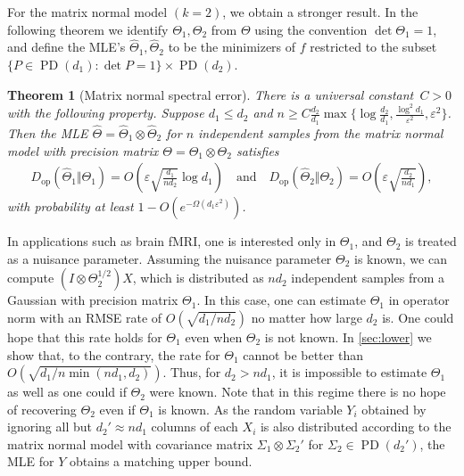 \documentclass[aos]{imsart}
\newtheorem{theorem}{Theorem}[section]
\theoremstyle{definition}
\numberwithin{equation}{section}
\DeclareMathOperator{\op}{op}
\DeclareMathOperator{\PD}{PD}
\newcommand{\htheta}{\widehat{\Theta}}
\newcommand{\ot}{\otimes}
\newcommand{\eps}{\varepsilon}
\begin{document}
For the matrix normal model $(k=2)$, we obtain a stronger result. In the following theorem we identify $\Theta_1, \Theta_2$ from $\Theta$ using the convention $\det \Theta_1 = 1$, and define the MLE's $\htheta_1, \htheta_2$ to be the minimizers of $f$ restricted to the subset $\{P \in \PD(d_1): \det P = 1\} \times \PD(d_2)$. 

\newcommand{\MatrixSpec}{%
There is a universal constant~$C>0$ with the following property.
Suppose $d_1 \leq d_2$ and $n \geq C \frac{d_2}{d_1} \max \{\log \frac{d_2}{d_1},  \frac{\log^2 d_1}{\eps^2}, \eps^2\}$. Then the MLE $\htheta = \htheta_1 \ot \htheta_2$ for $n$ independent samples from the matrix normal model with precision matrix $\Theta = \Theta_1 \ot \Theta_2$ satisfies
\begin{align*}
  D_{\op}(\widehat{\Theta}_1 \Vert \Theta_1) = O\left(\eps \sqrt{\frac{d_1}{nd_2}} \log d_1\right)
\quad\text{and}\quad
D_{\op}(\widehat{\Theta}_2 \Vert \Theta_2) = O\left(\eps \sqrt{\frac{d_2}{nd_1}}\right),
\end{align*}
with probability at least  $1 - O(e^{ - \Omega( d_1 \eps^2)})$. }


\begin{theorem}[Matrix normal spectral error]\label{thm:matrix-normal}
\MatrixSpec
\end{theorem}

In applications such as brain fMRI, one is interested only in $\Theta_1$, and $\Theta_2$ is treated as a nuisance parameter. Assuming the nuisance parameter $\Theta_2$ is known, we can compute $(I \ot \Theta_2^{1/2} )X$, which is distributed as $nd_2$ independent samples from a Gaussian with precision matrix $\Theta_1$. In this case, one can estimate $\Theta_1$ in operator norm with an RMSE rate of $O(\sqrt{ d_1/ n d_2})$ no matter how large $d_2$ is. One could hope that this rate holds for $\Theta_1$ even when $\Theta_2$ is not known. In \cref{sec:lower} we show that, to the contrary, the rate for $\Theta_1$ cannot be better than $O(\sqrt{d_1/ n \min(n d_1, d_2)})$. Thus, for $d_2 > n d_1$, it is impossible to estimate $\Theta_1$ as well as one could if $\Theta_2$ were known. Note that in this regime there is no hope of recovering $\Theta_2$ even if $\Theta_1$ is known. As the random variable $Y_i$ obtained by ignoring all but $d_2' \approx nd_1$ columns of each $X_i$ is also distributed according to the matrix normal model with covariance matrix $\Sigma_1 \ot \Sigma_2'$ for $\Sigma_2 \in \PD(d_2')$, the MLE for $Y$ obtains a matching upper bound.
\end{document}
